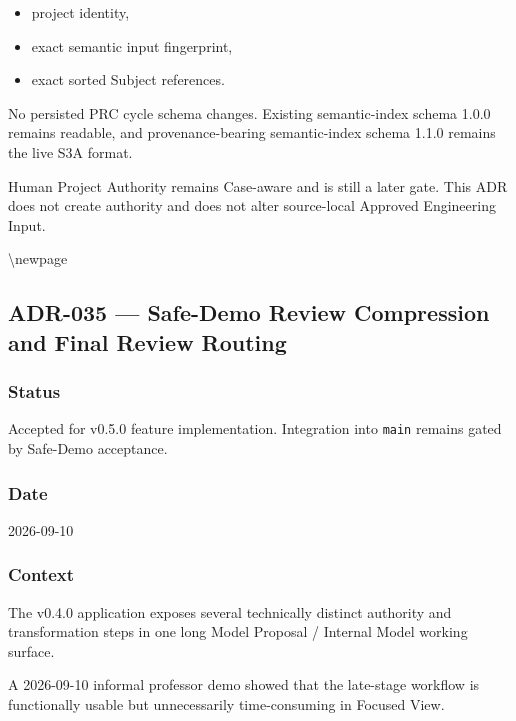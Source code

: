 \begin{itemize}
\tightlist
\item
  project identity,
\item
  exact semantic input fingerprint,
\item
  exact sorted Subject references.
\end{itemize}

No persisted PRC cycle schema changes. Existing semantic-index schema 1.0.0 remains readable, and provenance-bearing semantic-index schema 1.1.0 remains the live S3A format.

Human Project Authority remains Case-aware and is still a later gate. This ADR does not create authority and does not alter source-local Approved Engineering Input.

\textbackslash newpage

\hypertarget{adr-035--safe-demo-review-compression-and-final-review-routing}{%
\subsection{ADR-035 --- Safe-Demo Review Compression and Final Review Routing}\label{adr-035--safe-demo-review-compression-and-final-review-routing}}

\hypertarget{status-12}{%
\subsubsection{Status}\label{status-12}}

Accepted for v0.5.0 feature implementation. Integration into \texttt{main} remains gated by Safe-Demo acceptance.

\hypertarget{date-12}{%
\subsubsection{Date}\label{date-12}}

2026-09-10

\hypertarget{context-21}{%
\subsubsection{Context}\label{context-21}}

The v0.4.0 application exposes several technically distinct authority and transformation steps in one long Model Proposal / Internal Model working surface.

A 2026-09-10 informal professor demo showed that the late-stage workflow is functionally usable but unnecessarily time-consuming in Focused View.

